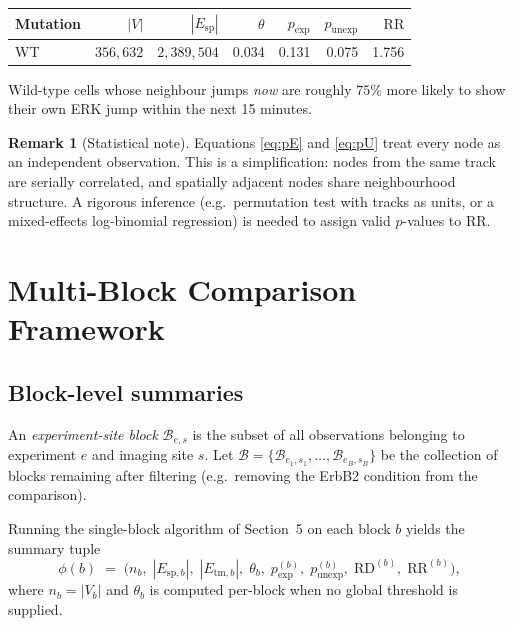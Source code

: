 \documentclass[11pt,a4paper]{article}
\theoremstyle{definition}
\newtheorem{remark}{Remark}[section]
\theoremstyle{plain}
\newcommand{\RD}{\mathrm{RD}}
\newcommand{\RR}{\mathrm{RR}}
\newcommand{\pE}{p_{\mathrm{exp}}}
\newcommand{\pU}{p_{\mathrm{unexp}}}
\newcommand{\1}[1]{\mathbf{1}\!\left[#1\right]}
\begin{document}
\begin{center}
\renewcommand{\arraystretch}{1.25}
\begin{tabular}{lrrrrrr}
\toprule
Mutation & $|V|$ & $|E_{\mathrm{sp}}|$ & $\theta$ & $\pE$ & $\pU$ & $\RR$ \\
\midrule
WT & $356{,}632$ & $2{,}389{,}504$ & 0.034 & 0.131 & 0.075 & 1.756 \\
\bottomrule
\end{tabular}
\end{center}

Wild-type cells whose neighbour jumps \emph{now} are roughly $75\%$ more likely
to show their own ERK jump within the next 15 minutes.

\begin{remark}[Statistical note]
Equations \eqref{eq:pE} and \eqref{eq:pU} treat every node as an
independent observation. This is a simplification: nodes from the same track
are serially correlated, and spatially adjacent nodes share neighbourhood
structure. A rigorous inference (e.g.\ permutation test with tracks as units,
or a mixed-effects log-binomial regression) is needed to assign valid
$p$-values to $\RR$.
\end{remark}

\section{Multi-Block Comparison Framework}

\subsection{Block-level summaries}

An \emph{experiment-site block} $\mathcal{B}_{e,s}$ is the subset of all
observations belonging to experiment $e$ and imaging site $s$.
Let
$\mathcal{B} = \{\mathcal{B}_{e_1,s_1}, \ldots, \mathcal{B}_{e_B,s_B}\}$
be the collection of blocks remaining after filtering (e.g.\ removing the
ErbB2 condition from the comparison).

Running the single-block algorithm of Section~5 on each block $b$ yields the
summary tuple
\[
  \phi(b) \;=\;
  \bigl(n_b,\; |E_{\mathrm{sp},b}|,\; |E_{\mathrm{tm},b}|,\;
    \theta_b,\; \pE^{(b)},\; \pU^{(b)},\; \RD^{(b)},\; \RR^{(b)}\bigr),
\]
where $n_b = |V_b|$ and $\theta_b$ is computed per-block when no global
threshold is supplied.
\end{document}

